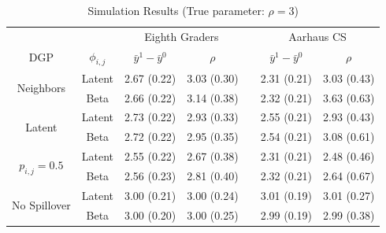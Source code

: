 \documentclass{article}
\begin{document}
\begin{table}[htbp]
  \caption{Simulation Results (True parameter: $\rho = 3$)}
  \label{table1}
  \centering
  \begin{tabular}{ccccccc}
    \toprule
    & & \multicolumn{2}{c}{Eighth Graders} & & \multicolumn{2}{c}{Aarhaus CS}              \\
    \cmidrule{3-4} \cmidrule{6-7}
    DGP & $\phi_{i,j}$ & $\bar{y}^1 - \bar{y}^0$ & $\rho$ & & $\bar{y}^1 - \bar{y}^0$ & $\rho$ \\
    \midrule
    \multirow{ 2}{*}{Neighbors} & Latent & 2.67 (0.22) & 3.03 (0.30) & & 2.31 (0.21) & 3.03 (0.43)    \\
    \cmidrule{2-7}
    & Beta & 2.66 (0.22) & 3.14 (0.38) & & 2.32 (0.21) & 3.63 (0.63)  \\
    \midrule
    \multirow{ 2}{*}{Latent}& Latent & 2.73 (0.22) & 2.93 (0.33)  & & 2.55 (0.21) & 2.93 (0.43)  \\
    \cmidrule{2-7}
    & Beta  & 2.72 (0.22) & 2.95 (0.35)  & & 2.54 (0.21) & 3.08 (0.61) \\
    \midrule
    \multirow{ 2}{*}{$p_{i,j} = 0.5$}& Latent & 2.55 (0.22) & 2.67 (0.38)  & & 2.31 (0.21) & 2.48 (0.46) \\
    \cmidrule{2-7} 
    & Beta  & 2.56 (0.23)& 2.81 (0.40)  & & 2.32 (0.21) & 2.64 (0.67)  \\
    \midrule
    \multirow{ 2}{*}{No Spillover}& Latent & 3.00 (0.21) & 3.00 (0.24)  & & 3.01 (0.19) & 3.01 (0.27) \\
    \cmidrule{2-7} 
    & Beta  & 3.00 (0.20) & 3.00 (0.25)  & & 2.99 (0.19) & 2.99 (0.38)  \\
    \bottomrule
  \end{tabular}
\end{table}
\end{document}
